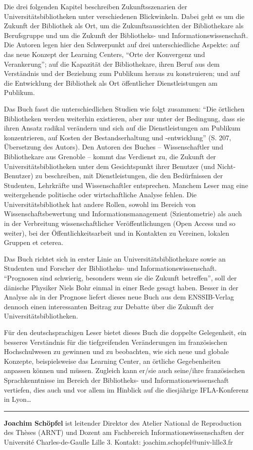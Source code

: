 \documentclass[a4paper,
fontsize=11pt,
oneside,
numbers=noperiodatend,
parskip=half-,
bibliography=totoc,
final
]{scrartcl}
\begin{document}
Die drei folgenden Kapitel beschreiben Zukunftsszenarien der
Universitätsbibliotheken unter verschiedenen Blickwinkeln. Dabei geht es
um die Zukunft der Bibliothek als Ort, um die Zukunftsaussichten der
Bibliothekare als Berufsgruppe und um die Zukunft der Bibliotheks- und
Informationswissenschaft. Die Autoren legen hier den Schwerpunkt auf
drei unterschiedliche Aspekte: auf das neue Konzept der Learning
Centers, \enquote{Orte der Konvergenz und Verankerung}; auf die
Kapazität der Bibliothekare, ihren Beruf aus dem Verständnis und der
Beziehung zum Publikum heraus zu konstruieren; und auf die Entwicklung
der Bibliothek als Ort öffentlicher Dienstleistungen am Publikum.

Das Buch fasst die unterschiedlichen Studien wie folgt zusammen:
\enquote{Die örtlichen Bibliotheken werden weiterhin existieren, aber
nur unter der Bedingung, dass sie ihren Ansatz radikal verändern und
sich auf die Dienstleistungen am Publikum konzentrieren, auf Kosten der
Bestandserhaltung und -entwicklung} (S. 207, Übersetzung des Autors).
Den Autoren des Buches -- Wissenschaftler und Bibliothekare aus Grenoble
-- kommt das Verdienst zu, die Zukunft der Universitätsbibliotheken
unter dem Gesichtspunkt ihrer Benutzer (und Nicht-Benutzer) zu
beschreiben, mit Dienstleistungen, die den Bedürfnissen der Studenten,
Lehrkräfte und Wissenschaftler entsprechen. Manchem Leser mag eine
weitergehende politische oder wirtschaftliche Analyse fehlen. Die
Universitätsbibliothek hat andere Rollen, sowohl im Bereich von
Wissenschaftsbewertung und Informationsmanagement (Szientometrie) als
auch in der Verbreitung wissenschaftlicher Veröffentlichungen (Open
Access und so weiter), bei der Öffentlichkeitsarbeit und in Kontakten zu
Vereinen, lokalen Gruppen et ceterea.~

Das Buch richtet sich in erster Linie an Universitätsbibliothekare sowie
an Studenten und Forscher der Bibliotheks- und Informationswissenschaft.
\enquote{Prognosen sind schwierig, besonders wenn sie die Zukunft
betreffen}, soll der dänische Physiker Niels Bohr einmal in einer Rede
gesagt haben. Besser in der Analyse als in der Prognose liefert dieses
neue Buch aus dem ENSSIB-Verlag dennoch einen interessanten Beitrag zur
Debatte über die Zukunft der Universitätsbibliotheken.

Für den deutschsprachigen Leser bietet dieses Buch die doppelte
Gelegenheit, ein besseres Verständnis für die tiefgreifenden
Veränderungen im französischen Hochschulwesen zu gewinnen und zu
beobachten, wie sich neue und globale Konzepte, beispielsweise das
Learning Center, an örtliche Gegebenheiten anpassen können und müssen.
Zugleich kann er/sie auch seine/ihre französischen Sprachkenntnisse im
Bereich der Bibliotheks- und Informationswissenschaft vertiefen, dies
auch und vor allem im Hinblick auf die diesjährige IFLA-Konferenz in
Lyon\ldots{}

\begin{center}\rule{3in}{0.4pt}\end{center}

\textbf{Joachim Schöpfel} ist leitender Direktor des Atelier National de
Reproduction des Thèses (ARNT) und Dozent am Fachbereich
Informationswissenschaften der Université Charles-de-Gaulle Lille 3.
Kontakt: joachim.schopfel@univ-lille3.fr
\end{document}
